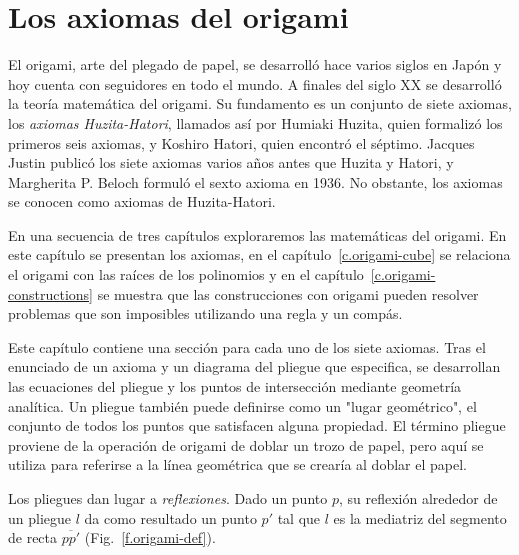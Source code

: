 
\chapter{Los axiomas del origami}\label{c.origami-axioms}


El origami, arte del plegado de papel, se desarrolló hace varios siglos en Japón y hoy cuenta con seguidores en todo el mundo. A finales del siglo XX se desarrolló la teoría matemática del origami. Su fundamento es un conjunto de siete axiomas, los \emph{axiomas Huzita-Hatori}, llamados así por Humiaki Huzita, quien formalizó los primeros seis axiomas, y Koshiro Hatori, quien encontró el séptimo. Jacques Justin publicó los siete axiomas varios años antes que Huzita y Hatori, y Margherita P. Beloch formuló el sexto axioma en 1936. No obstante, los axiomas se conocen como axiomas de Huzita-Hatori.

En una secuencia de tres capítulos exploraremos las matemáticas del origami. En este capítulo se presentan los axiomas, en el capítulo~\ref{c.origami-cube} se relaciona el origami con las raíces de los polinomios y en el capítulo~\ref{c.origami-constructions} se muestra que las construcciones con origami pueden resolver problemas que son imposibles utilizando una regla y un compás.
 
Este capítulo contiene una sección para cada uno de los siete axiomas. Tras el enunciado de un axioma y un diagrama del pliegue que especifica, se desarrollan las ecuaciones del pliegue y los puntos de intersección mediante geometría analítica. Un pliegue también puede definirse como un "lugar geométrico", el conjunto de todos los puntos que satisfacen alguna propiedad. El término pliegue proviene de la operación de origami de doblar un trozo de papel, pero aquí se utiliza para referirse a la línea geométrica que se crearía al doblar el papel.

Los pliegues dan lugar a \emph{reflexiones}. Dado un punto $p$, su reflexión alrededor de un pliegue $l$ da como resultado un punto $p'$ tal que $l$ es la mediatriz del segmento de recta $\overline{pp'}$ (Fig.~\ref{f.origami-def}).

